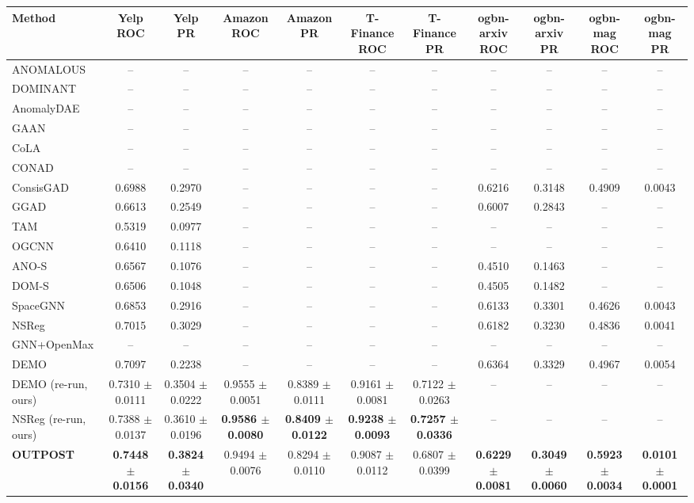 \begin{table}[t]
\centering
\small
\begin{tabular}{lcccccccccc}
\toprule
Method & Yelp ROC & Yelp PR & Amazon ROC & Amazon PR & T-Finance ROC & T-Finance PR & ogbn-arxiv ROC & ogbn-arxiv PR & ogbn-mag ROC & ogbn-mag PR \\
\midrule
ANOMALOUS & -- & -- & -- & -- & -- & -- & -- & -- & -- & -- \\
DOMINANT & -- & -- & -- & -- & -- & -- & -- & -- & -- & -- \\
AnomalyDAE & -- & -- & -- & -- & -- & -- & -- & -- & -- & -- \\
GAAN & -- & -- & -- & -- & -- & -- & -- & -- & -- & -- \\
CoLA & -- & -- & -- & -- & -- & -- & -- & -- & -- & -- \\
CONAD & -- & -- & -- & -- & -- & -- & -- & -- & -- & -- \\
ConsisGAD & 0.6988 & 0.2970 & -- & -- & -- & -- & 0.6216 & 0.3148 & 0.4909 & 0.0043 \\
GGAD & 0.6613 & 0.2549 & -- & -- & -- & -- & 0.6007 & 0.2843 & -- & -- \\
TAM & 0.5319 & 0.0977 & -- & -- & -- & -- & -- & -- & -- & -- \\
OGCNN & 0.6410 & 0.1118 & -- & -- & -- & -- & -- & -- & -- & -- \\
ANO-S & 0.6567 & 0.1076 & -- & -- & -- & -- & 0.4510 & 0.1463 & -- & -- \\
DOM-S & 0.6506 & 0.1048 & -- & -- & -- & -- & 0.4505 & 0.1482 & -- & -- \\
SpaceGNN & 0.6853 & 0.2916 & -- & -- & -- & -- & 0.6133 & 0.3301 & 0.4626 & 0.0043 \\
NSReg & 0.7015 & 0.3029 & -- & -- & -- & -- & 0.6182 & 0.3230 & 0.4836 & 0.0041 \\
GNN+OpenMax & -- & -- & -- & -- & -- & -- & -- & -- & -- & -- \\
DEMO & 0.7097 & 0.2238 & -- & -- & -- & -- & 0.6364 & 0.3329 & 0.4967 & 0.0054 \\
DEMO (re-run, ours) & 0.7310 $\pm$ 0.0111 & 0.3504 $\pm$ 0.0222 & 0.9555 $\pm$ 0.0051 & 0.8389 $\pm$ 0.0111 & 0.9161 $\pm$ 0.0081 & 0.7122 $\pm$ 0.0263 & -- & -- & -- & -- \\
NSReg (re-run, ours) & 0.7388 $\pm$ 0.0137 & 0.3610 $\pm$ 0.0196 & \textbf{0.9586 $\pm$ 0.0080} & \textbf{0.8409 $\pm$ 0.0122} & \textbf{0.9238 $\pm$ 0.0093} & \textbf{0.7257 $\pm$ 0.0336} & -- & -- & -- & -- \\
\midrule
\textbf{OUTPOST} & \textbf{0.7448 $\pm$ 0.0156} & \textbf{0.3824 $\pm$ 0.0340} & 0.9494 $\pm$ 0.0076 & 0.8294 $\pm$ 0.0110 & 0.9087 $\pm$ 0.0112 & 0.6807 $\pm$ 0.0399 & \textbf{0.6229 $\pm$ 0.0081} & \textbf{0.3049 $\pm$ 0.0060} & \textbf{0.5923 $\pm$ 0.0034} & \textbf{0.0101 $\pm$ 0.0001} \\

\end{tabular}
\end{table}
